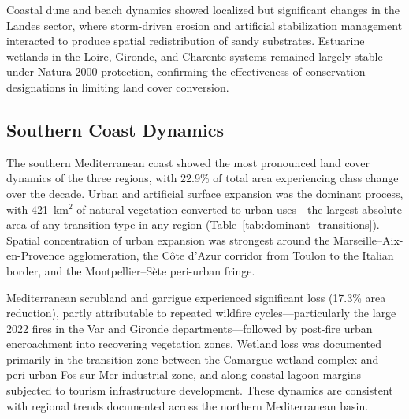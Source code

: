 \documentclass[coasts,article,accept,pdftex,moreauthors]{Definitions/mdpi}
\begin{document}
Coastal dune and beach dynamics showed localized but significant changes in the Landes sector, where storm-driven erosion and artificial stabilization management interacted to produce spatial redistribution of sandy substrates. Estuarine wetlands in the Loire, Gironde, and Charente systems remained largely stable under Natura 2000 protection, confirming the effectiveness of conservation designations in limiting land cover conversion.

\subsection{Southern Coast Dynamics}

The southern Mediterranean coast showed the most pronounced land cover dynamics of the three regions, with 22.9\% of total area experiencing class change over the decade. Urban and artificial surface expansion was the dominant process, with 421~km$^2$ of natural vegetation converted to urban uses—the largest absolute area of any transition type in any region (Table~\ref{tab:dominant_transitions}). Spatial concentration of urban expansion was strongest around the Marseille--Aix-en-Provence agglomeration, the Côte d'Azur corridor from Toulon to the Italian border, and the Montpellier--Sète peri-urban fringe.

Mediterranean scrubland and garrigue experienced significant loss (17.3\% area reduction), partly attributable to repeated wildfire cycles—particularly the large 2022 fires in the Var and Gironde departments—followed by post-fire urban encroachment into recovering vegetation zones. Wetland loss was documented primarily in the transition zone between the Camargue wetland complex and peri-urban Fos-sur-Mer industrial zone, and along coastal lagoon margins subjected to tourism infrastructure development. These dynamics are consistent with regional trends documented across the northern Mediterranean basin.
\end{document}
